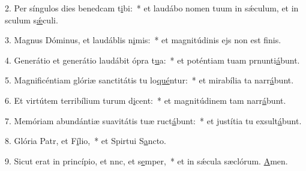 2. Per síngulos dies benedcam t\uline{i}bi:~* et laudábo nomen tuum in sǽculum, et in sculum s\uline{ǽ}culi.\par 
3. Magnus Dóminus, et laudáblis n\uline{i}mis:~* et magnitúdinis ejs non est f\uline{i}nis.\par 
4. Generátio et generátio laudábit ópra t\uline{u}a:~* et poténtiam tuam prnunti\uline{á}bunt.\par 
5. Magnificéntiam glóriæ sanctitátis tu lo\uline{qué}ntur:~* et mirabília ta narr\uline{á}bunt.\par 
6. Et virtútem terribílium turum d\uline{i}cent:~* et magnitúdinem tam narr\uline{á}bunt.\par 
7. Memóriam abundántiæ suavitátis tuæ ruct\uline{á}bunt:~* et justítia tu exsult\uline{á}bunt.\par 
8. Glória Patr, et F\uline{í}lio,~* et Spirtui S\uline{a}ncto.\par 
9. Sicut erat in princípio, et nnc, et s\uline{e}mper,~* et in sǽcula sæclórum. \uline{A}men.\par 
